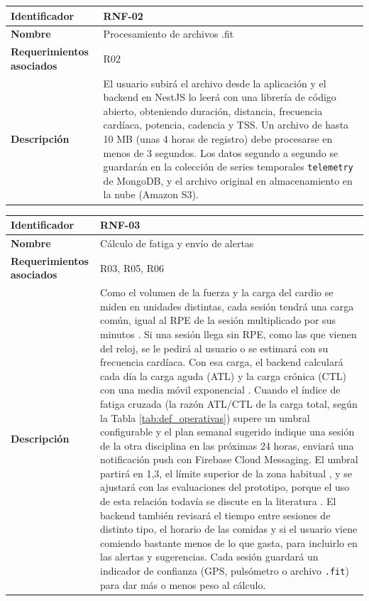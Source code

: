 \begin{table}[h!]
    \centering
    \renewcommand{\arraystretch}{1.3}
    \begin{tabular}{|p{3.5cm}|p{11.5cm}|}
        \hline
        \rowcolor[HTML]{EFEFEF}
        \textbf{Identificador} & \textbf{RNF-02} \\ \hline
        \textbf{Nombre} & Procesamiento de archivos .fit \\ \hline
        \textbf{Requerimientos asociados} & R02 \\ \hline
        \textbf{Descripción} & El usuario subirá el archivo desde la aplicación y el backend en NestJS lo leerá con una librería de código abierto, obteniendo duración, distancia, frecuencia cardíaca, potencia, cadencia y TSS. Un archivo de hasta 10 MB (unas 4 horas de registro) debe procesarse en menos de 3 segundos. Los datos segundo a segundo se guardarán en la colección de series temporales \texttt{telemetry} de MongoDB, y el archivo original en almacenamiento en la nube (Amazon S3). \\ \hline
    \end{tabular}
\end{table}
\newpage
\begin{table}[h!]
    \centering
    \renewcommand{\arraystretch}{1.3}
    \begin{tabular}{|p{3.5cm}|p{11.5cm}|}
        \hline
        \rowcolor[HTML]{EFEFEF}
        \textbf{Identificador} & \textbf{RNF-03} \\ \hline
        \textbf{Nombre} & Cálculo de fatiga y envío de alertas \\ \hline
        \textbf{Requerimientos asociados} & R03, R05, R06 \\ \hline
        \textbf{Descripción} & Como el volumen de la fuerza y la carga del cardio se miden en unidades distintas, cada sesión tendrá una carga común, igual al RPE de la sesión multiplicado por sus minutos \citep{foster2001monitoring}. Si una sesión llega sin RPE, como las que vienen del reloj, se le pedirá al usuario o se estimará con su frecuencia cardíaca. Con esa carga, el backend calculará cada día la carga aguda (ATL) y la carga crónica (CTL) con una media móvil exponencial \citep{williams2017better}. Cuando el índice de fatiga cruzada (la razón ATL/CTL de la carga total, según la Tabla \ref{tab:def_operativas}) supere un umbral configurable y el plan semanal sugerido indique una sesión de la otra disciplina en las próximas 24 horas, enviará una notificación push con Firebase Cloud Messaging. El umbral partirá en 1,3, el límite superior de la zona habitual \citep{gabbett2016training}, y se ajustará con las evaluaciones del prototipo, porque el uso de esta relación todavía se discute en la literatura \citep{impellizzeri2020acute}. El backend también revisará el tiempo entre sesiones de distinto tipo, el horario de las comidas y si el usuario viene comiendo bastante menos de lo que gasta, para incluirlo en las alertas y sugerencias. Cada sesión guardará un indicador de confianza (GPS, pulsómetro o archivo \texttt{.fit}) para dar más o menos peso al cálculo. \\ \hline
    \end{tabular}
\end{table}

